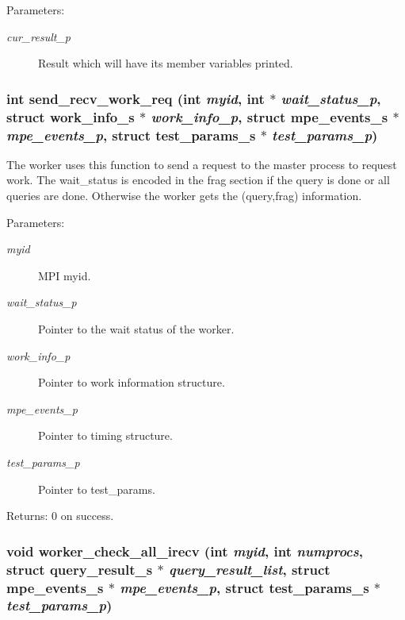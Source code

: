 \begin{Desc}
\item[Parameters:]
\begin{description}
\item[{\em cur\_\-result\_\-p}]Result which will have its member variables printed. \end{description}
\end{Desc}
\subsubsection{\setlength{\rightskip}{0pt plus 5cm}int send\_\-recv\_\-work\_\-req (int {\em myid}, int $\ast$ {\em wait\_\-status\_\-p}, struct \bf{work\_\-info\_\-s} $\ast$ {\em work\_\-info\_\-p}, struct \bf{mpe\_\-events\_\-s} $\ast$ {\em mpe\_\-events\_\-p}, struct \bf{test\_\-params\_\-s} $\ast$ {\em test\_\-params\_\-p})}\label{worker__help_8h_ffb5c0f03d99f627905b665625b18c54}


The worker uses this function to send a request to the master process to request work. The wait\_\-status is encoded in the frag section if the query is done or all queries are done. Otherwise the worker gets the (query,frag) information.

\begin{Desc}
\item[Parameters:]
\begin{description}
\item[{\em myid}]MPI myid. \item[{\em wait\_\-status\_\-p}]Pointer to the wait status of the worker. \item[{\em work\_\-info\_\-p}]Pointer to work information structure. \item[{\em mpe\_\-events\_\-p}]Pointer to timing structure. \item[{\em test\_\-params\_\-p}]Pointer to test\_\-params. \end{description}
\end{Desc}
\begin{Desc}
\item[Returns:]0 on success. \end{Desc}
\subsubsection{\setlength{\rightskip}{0pt plus 5cm}void worker\_\-check\_\-all\_\-irecv (int {\em myid}, int {\em numprocs}, struct \bf{query\_\-result\_\-s} $\ast$ {\em query\_\-result\_\-list}, struct \bf{mpe\_\-events\_\-s} $\ast$ {\em mpe\_\-events\_\-p}, struct \bf{test\_\-params\_\-s} $\ast$ {\em test\_\-params\_\-p})}\label{worker__help_8h_18eec021c54dddd519b819fa28ff4003}


